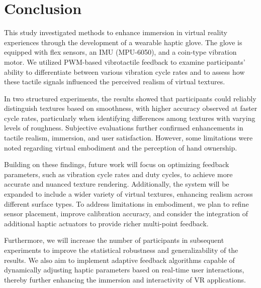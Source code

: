 \chapter{Conclusion} %

\label{Chapter6}

This study investigated methods to enhance immersion in virtual reality experiences through the development of a wearable haptic glove. The glove is equipped with flex sensors, an IMU (MPU-6050), and a coin-type vibration motor. We utilized PWM-based vibrotactile feedback to examine participants' ability to differentiate between various vibration cycle rates and to assess how these tactile signals influenced the perceived realism of virtual textures.

In two structured experiments, the results showed that participants could reliably distinguish textures based on smoothness, with higher accuracy observed at faster cycle rates, particularly when identifying differences among textures with varying levels of roughness. Subjective evaluations further confirmed enhancements in tactile realism, immersion, and user satisfaction. However, some limitations were noted regarding virtual embodiment and the perception of hand ownership.

Building on these findings, future work will focus on optimizing feedback parameters, such as vibration cycle rates and duty cycles, to achieve more accurate and nuanced texture rendering. Additionally, the system will be expanded to include a wider variety of virtual textures, enhancing realism across different surface types. To address limitations in embodiment, we plan to refine sensor placement, improve calibration accuracy, and consider the integration of additional haptic actuators to provide richer multi-point feedback. 

Furthermore, we will increase the number of participants in subsequent experiments to improve the statistical robustness and generalizability of the results. We also aim to implement adaptive feedback algorithms capable of dynamically adjusting haptic parameters based on real-time user interactions, thereby further enhancing the immersion and interactivity of VR applications.





